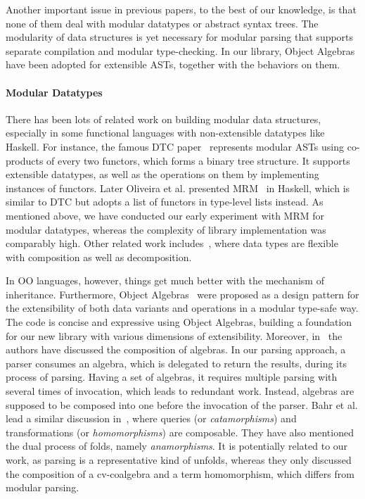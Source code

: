 Another important issue in previous papers, to the best of our knowledge, is that none of them deal with modular datatypes or abstract syntax trees. The modularity of data structures is yet necessary for modular parsing that supports separate compilation and modular type-checking. In our library, Object Algebras have been adopted for extensible ASTs, together with the behaviors on them.

\paragraph*{Modular Datatypes} There has been lots of related work on building modular data structures, especially in some functional languages with non-extensible datatypes like Haskell. For instance, the famous DTC paper~\cite{swierstra2008} represents modular ASTs using co-products of every two functors, which forms a binary tree structure. It supports extensible datatypes, as well as the operations on them by implementing instances of functors. Later Oliveira et al. presented MRM~\cite{Oliveira2015} in Haskell, which is similar to DTC but adopts a list of functors in type-level lists instead. As mentioned above, we have conducted our early experiment with MRM for modular datatypes, whereas the complexity of library implementation was comparably high. Other related work includes~\cite{Bahr2014}, where data types are flexible with composition as well as decomposition.

In OO languages, however, things get much better with the mechanism of inheritance. Furthermore, Object Algebras~\cite{Oliveira2012} were proposed as a design pattern for the extensibility of both data variants and operations in a modular type-safe way. The code is concise and expressive using Object Algebras, building a foundation for our new library with various dimensions of extensibility. Moreover, in~\cite{Oliveira2012} the authors have discussed the composition of algebras. In our parsing approach, a parser consumes an algebra, which is delegated to return the results, during its process of parsing. Having a set of algebras, it requires multiple parsing with several times of invocation, which leads to redundant work. Instead, algebras are supposed to be composed into one before the invocation of the parser. Bahr et al. lead a similar discussion in~\cite{Bahr2011}, where queries (or \textit{catamorphisms}) and transformations (or \textit{homomorphisms}) are composable. They have also mentioned the dual process of folds, namely \textit{anamorphisms}. It is potentially related to our work, as parsing is a representative kind of unfolds, whereas they only discussed the composition of a cv-coalgebra and a term homomorphism, which differs from modular parsing.

